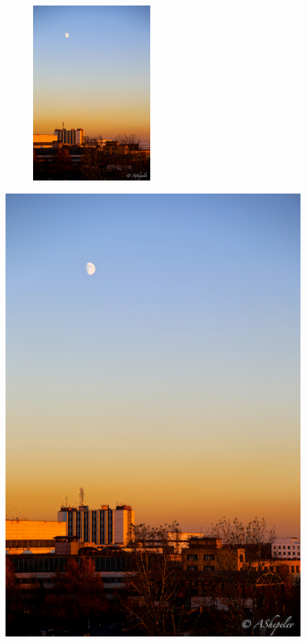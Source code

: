 \documentclass[10pt]{article}
\begin{document}
	\newpage	
	\lipsum[1-4] 
	
	\begin{figure}
		\vspace{-1pc}
		\includegraphics[width = 0.4\textwidth]{img/moon}
		\caption{}	
	\end{figure} 
	\lipsum[4-5]
	\vspace{1cm}
	
	
	\lipsum[1]
	
	\noindent
	\begin{minipage}[c][10cm][c]{0.54\textwidth}
		\lipsum[3]
	\end{minipage}
	\hfill
	\begin{minipage}[c][8cm][c]{0.44\textwidth}
		\centering
		\includegraphics[width = 0.85\textwidth]{img/moon}
	\end{minipage}
	
	\lipsum[2]
\end{document}
